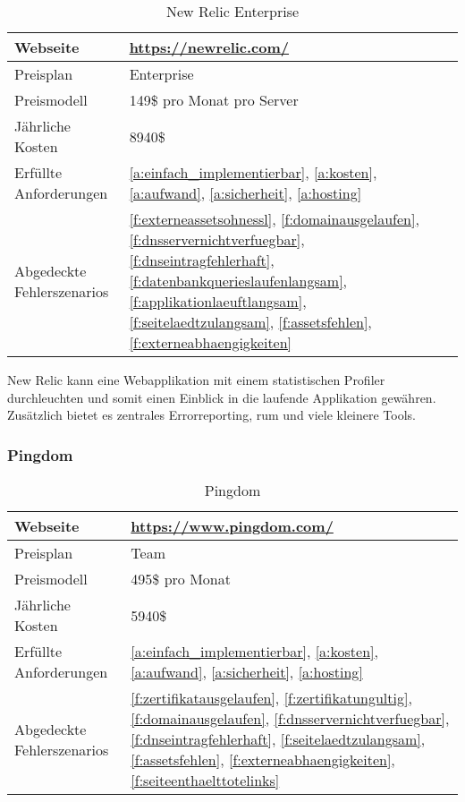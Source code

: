 \begin{table}[H]
  \centering
  \begin{tabular}{p{5cm} p{7cm}}
  \toprule
    Webseite & \url{https://newrelic.com/}\\
  \hline
    Preisplan & Enterprise\\
  \hline
    Preismodell & 149\$ pro Monat pro Server\\
  \hline
    Jährliche Kosten & 8940\$\\
  \hline
    Erfüllte Anforderungen & \ref{a:einfach_implementierbar}, \ref{a:kosten}, \ref{a:aufwand}, \ref{a:sicherheit}, \ref{a:hosting}\\
  \hline
    Abgedeckte Fehlerszenarios & \ref{f:externeassetsohnessl}, \ref{f:domainausgelaufen}, \ref{f:dnsservernichtverfuegbar}, \ref{f:dnseintragfehlerhaft}, \ref{f:datenbankquerieslaufenlangsam}, \ref{f:applikationlaeuftlangsam}, \ref{f:seitelaedtzulangsam}, \ref{f:assetsfehlen}, \ref{f:externeabhaengigkeiten}\\
  \bottomrule
  \end{tabular}
  \caption{New Relic Enterprise}
  \label{tab:new_relic_enterprise}
\end{table}

New Relic kann eine Webapplikation mit einem statistischen Profiler durchleuchten und somit einen Einblick in die laufende Applikation gewähren. Zusätzlich bietet es zentrales Errorreporting, \acrlong{rum}  und viele kleinere Tools.

\subsubsection{Pingdom}
\label{ssub:pingdom}

\begin{table}[H]
  \centering
  \begin{tabular}{p{5cm} p{7cm}}
  \toprule
    Webseite & \url{https://www.pingdom.com/}\\
  \hline
    Preisplan & Team\\
  \hline
    Preismodell & 495\$ pro Monat\\
  \hline
    Jährliche Kosten & 5940\$\\
  \hline
    Erfüllte Anforderungen & \ref{a:einfach_implementierbar}, \ref{a:kosten}, \ref{a:aufwand}, \ref{a:sicherheit}, \ref{a:hosting}\\
  \hline
    Abgedeckte Fehlerszenarios & \ref{f:zertifikatausgelaufen}, \ref{f:zertifikatungultig}, \ref{f:domainausgelaufen}, \ref{f:dnsservernichtverfuegbar}, \ref{f:dnseintragfehlerhaft}, \ref{f:seitelaedtzulangsam}, \ref{f:assetsfehlen}, \ref{f:externeabhaengigkeiten}, \ref{f:seiteenthaelttotelinks}\\
  \bottomrule
  \end{tabular}
  \caption{Pingdom}
  \label{tab:pingdom}
\end{table}

